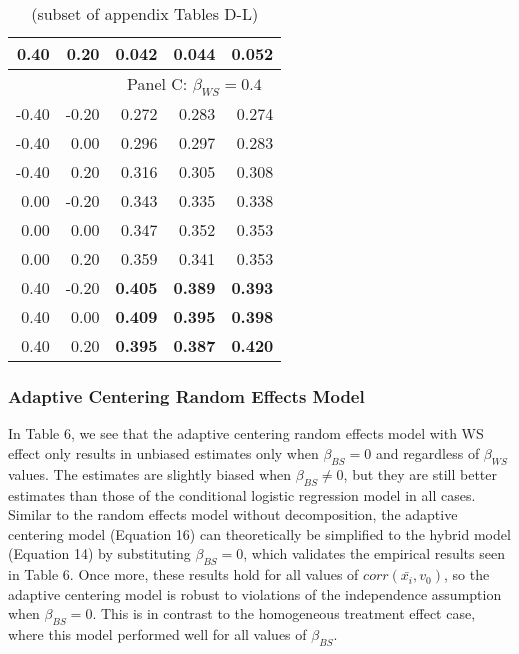 \documentclass{article}
\begin{document}
\begin{table}[ht]
\begin{tabular}{|r r || r r r |}
                0.40	&0.20	&0.042	&0.044	&0.052 \\
                \hline
                \multicolumn{2}{|c||}{} & \multicolumn{3}{c|}{Panel C: $\beta_{WS} = 0.4$} \\
                \hline
                -0.40	&-0.20	&0.272	&0.283	&0.274 \\
                -0.40	&0.00	&0.296	&0.297	&0.283 \\
                -0.40	&0.20	&0.316	&0.305	&0.308 \\
                0.00	&-0.20	&0.343	&0.335	&0.338 \\
                0.00	&0.00	&0.347	&0.352	&0.353 \\
                0.00	&0.20	&0.359	&0.341	&0.353 \\
                0.40	&-0.20	&\textbf{0.405}	&\textbf{0.389}	&\textbf{0.393} \\
                0.40	&0.00	&\textbf{0.409}	&\textbf{0.395}	&\textbf{0.398} \\
                0.40	&0.20	&\textbf{0.395}	&\textbf{0.387}	&\textbf{0.420} \\
                \hline
            \end{tabular}
        \caption*{(subset of appendix Tables D-L)}
        \end{table}
        
    
        \subsubsection{Adaptive Centering Random Effects Model}
        
        In Table 6, we see that the adaptive centering random effects model with WS effect only results in unbiased estimates only when $\beta_{BS} = 0$ and regardless of $\beta_{WS}$ values. The estimates are slightly biased when $\beta_{BS} \neq 0$, but they are still better estimates than those of the conditional logistic regression model in all cases. Similar to the random effects model without decomposition, the adaptive centering model (Equation 16) can theoretically be simplified to the hybrid model (Equation 14) by substituting $\beta_{BS} = 0$, which validates the empirical results seen in Table 6. Once more, these results hold for all values of $corr(\bar{x_i},v_0)$, so the adaptive centering model is robust to violations of the independence assumption when $\beta_{BS} = 0$. This is in contrast to the homogeneous treatment effect case, where this model performed well for all values of $\beta_{BS}$.
        
\end{document}
